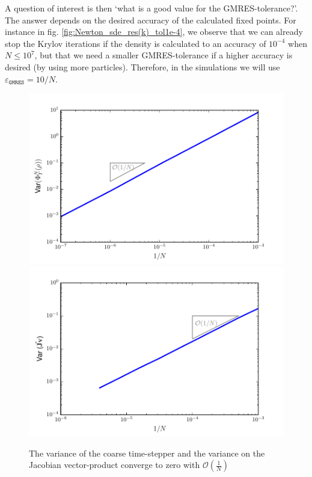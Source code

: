 A question of interest is then `what is a good value for the GMRES-tolerance?'. The answer depends on the desired accuracy of the calculated fixed points. For instance in fig. \ref{fig:Newton_sde_res(k)_tol1e-4}, we observe that we  can already stop the Krylov iterations if the density is calculated to an accuracy of %
$10^{-4}$ when $N \leq 10^7$, but that we need a smaller GMRES-tolerance if a higher accuracy is desired (by using more particles). Therefore, in the simulations we  will use $\varepsilon_{\texttt{GMRES}}= 10/N$.


\begin{figure}[H!]
\centering
\includegraphics[width=0.49\linewidth]{../Problems/WeightedParticles/checkSystem/plots/Variance_on_cts(N-1)}
\includegraphics[width=0.49\linewidth]{../Problems/WeightedParticles/checkSystem/plots/Variance_on_Jv}
\caption{The variance of the coarse time-stepper and the variance on the Jacobian vector-product converge to zero with $\mathcal{O}(\frac{1}{N})$ }
\label{fig:Variance_on_cts(N-1)}
\end{figure}



